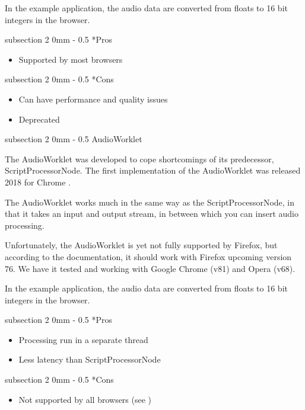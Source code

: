 \documentclass[11pt, a4paper, twoside]{article}
\makeatletter
\renewcommand{\subsection}{\@startsection
  {subsection}%
  {2}%
  {0mm}%
  {-\baselineskip}%
  {0.5\baselineskip}%
  {\bfseries\sffamily\large}}%
\makeatother
\begin{document}
In the example application, the audio data are converted from floats
to 16 bit integers in the browser.

\subsection*{Pros}
\begin{itemize}
\item Supported by most browsers
\end{itemize}

\subsection*{Cons}
\begin{itemize}
\item Can have performance and quality issues
\item Deprecated
\end{itemize}


\subsection{AudioWorklet}

The AudioWorklet was developed to cope shortcomings of its
predecessor, ScriptProcessorNode. The first implementation of the
AudioWorklet was released 2018 for Chrome \cite{icmc}.

The AudioWorklet works much in the same way as the
ScriptProcessorNode, in that it takes an input and output stream, in
between which you can insert audio processing.


Unfortunately, the AudioWorklet is yet not fully supported by Firefox,
but according to the documentation, it should work with Firefox
upcoming version 76. We have it tested and working with Google Chrome
(v81) and Opera (v68).

In the example application, the audio data are converted from floats
to 16 bit integers in the browser.

\subsection*{Pros}
\begin{itemize}
\item Processing run in a separate thread
\item Less latency than ScriptProcessorNode
\end{itemize}

\subsection*{Cons}
\begin{itemize}
\item Not supported by all browsers (see \cite{audioworklet})
\end{itemize}
\end{document}

